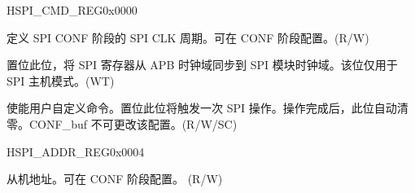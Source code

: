 \begin{register}{H}{SPI\_CMD\_REG}{0x0000}\label{regdesc:SPICMDREG}
%
%
%
%
%
\regnewline%
\begin{regdesc}\begin{reglist}
\label{fielddesc:SPICONFBITLEN}\item [SPI\_CONF\_BITLEN] 定义 SPI CONF 阶段的 SPI CLK 周期。可在 CONF 阶段配置。(R/W)
\label{fielddesc:SPIUPDATE}\item [SPI\_UPDATE] 置位此位，将 SPI 寄存器从 APB 时钟域同步到 SPI 模块时钟域。该位仅用于 SPI 主机模式。(WT)
\label{fielddesc:SPIUSR}\item [SPI\_USR] 使能用户自定义命令。置位此位将触发一次 SPI 操作。操作完成后，此位自动清零。CONF\_buf 不可更改该配置。(R/W/SC)
\end{reglist}\end{regdesc}
\end{register}


\begin{register}{H}{SPI\_ADDR\_REG}{0x0004}\label{regdesc:SPIADDRREG}
%
\regnewline%
\begin{regdesc}\begin{reglist}
\label{fielddesc:SPIUSRADDRVALUE}\item [SPI\_USR\_ADDR\_VALUE] 从机地址。可在 CONF 阶段配置。 (R/W)
\end{reglist}\end{regdesc}
\end{register}


